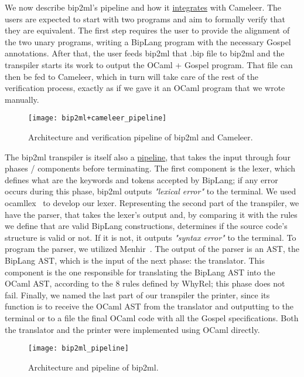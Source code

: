 We now describe bip2ml's pipeline and how it \hyperref[fig:bip2ml_cameleer_pipeline]{integrates} with Cameleer.
The users are expected to start with two programs and aim to formally verify that they are equivalent.
The first step requires the user to provide the alignment of the two unary programs, writing a BipLang program with the necessary Gospel annotations.
After that, the user feeds bip2ml that .bip file to bip2ml and the transpiler starts its work to output the OCaml + Gospel program.
That file can then be fed to Cameleer, which in turn will take care of the rest of the verification process, exactly as if we gave it an OCaml program that we wrote manually.

\begin{figure}[htbp]
  \centering
  \texttt{[image: bip2ml+cameleer\_pipeline]}
  \caption{Architecture and verification pipeline of bip2ml and Cameleer.}
  \label{fig:bip2ml_cameleer_pipeline}
\end{figure}

The bip2ml transpiler is itself also a \hyperref[fig:bip2ml_cameleer_pipeline]{pipeline}, that takes the input through four phases / components before terminating.
The first component is the lexer, which defines what are the keywords and tokens accepted by BipLang; if any error occurs during this phase, bip2ml outputs \emph{"lexical error"} to the terminal.
We used ocamllex~\cite{ocamllex} to develop our lexer.
Representing the second part of the transpiler, we have the parser, that takes the lexer's output and, by comparing it with the rules we define that are valid BipLang constructions, determines if the source code's structure is valid or not.
If it is not, it outputs \emph{"syntax error"} to the terminal.
To program the parser, we utilized Menhir~\cite{menhir}.
The output of the parser is an AST, the BipLang AST, which is the input of the next phase: the translator.
This component is the one responsible for translating the BipLang AST into the OCaml AST, according to the 8 rules defined by WhyRel; this phase does not fail.
Finally, we named the last part of our transpiler the printer, since its function is to receive the OCaml AST from the translator and outputting to the terminal or to a file the final OCaml code with all the Gospel specifications.
Both the translator and the printer were implemented using OCaml directly.

\begin{figure}[htbp]
  \centering
  \texttt{[image: bip2ml\_pipeline]}
  \caption{Architecture and pipeline of bip2ml.}
  \label{fig:bip2ml_pipeline}
\end{figure}

